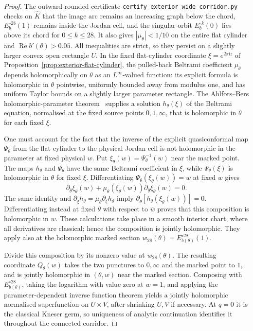 \documentclass[11pt,a4paper]{article}
\theoremstyle{definition}
\newcommand{\ii}{\mathrm{i}}
\begin{document}
\begin{proof}
The outward-rounded certificate
\texttt{certify\_exterior\_wide\_corridor.py} checks on $\widehat K$
that the image arc remains an increasing graph below the chord,
$E_b^{\circ28}(1)$ remains inside the Jordan cell, and the singular
orbit $E_b^{\circ k}(0)$ lies above its chord for $0\le k\le28$.
It also gives $|\mu_\theta|<1/10$ on the entire flat cylinder and
$\operatorname{Re}b'(\theta)>0.05$.  All inequalities are strict,
so they persist on a slightly larger convex open rectangle $U$.
In the fixed flat-cylinder coordinate
$\xi=e^{2\pi\ii z}$ of
Proposition~\ref{prop:exterior-flat-cylinder}, the pulled-back
Beltrami coefficient $\mu_\theta$ depends holomorphically on
$\theta$ as an $L^\infty$-valued function: its explicit formula is
holomorphic in $\theta$ pointwise, uniformly bounded away from
modulus one, and has uniform Taylor bounds on a slightly larger
parameter rectangle.  The Ahlfors--Bers holomorphic-parameter
theorem~\cite[Thm.~11]{AhlforsBers1960} supplies a solution
$h_\theta(\xi)$ of the Beltrami equation, normalised at the fixed
source points $0,1,\infty$, that is holomorphic in $\theta$ for
each fixed $\xi$.

One must account for the fact that the inverse of the explicit
quasiconformal map $\Psi_\theta$ from the flat cylinder to the
physical Jordan cell is not holomorphic in the parameter at fixed
physical $w$.  Put $\xi_\theta(w)=\Psi_\theta^{-1}(w)$ near the
marked point.  The maps $h_\theta$ and $\Psi_\theta$ have the same
Beltrami coefficient in $\xi$, while $\Psi_\theta(\xi)$ is
holomorphic in $\theta$ for fixed $\xi$.  Differentiating
$\Psi_\theta(\xi_\theta(w))=w$ at fixed $w$ gives
\[
 \partial_{\bar\theta}\xi_\theta(w)
 +\mu_\theta(\xi_\theta(w))
       \partial_{\bar\theta}\overline{\xi_\theta(w)}=0.
\]
The same identity and $\partial_{\bar\xi}h_\theta
=\mu_\theta\partial_\xi h_\theta$ imply
$\partial_{\bar\theta}
  [h_\theta(\xi_\theta(w))]=0$.
Differentiating instead at fixed $\theta$ with respect to
$\bar w$ proves that this composition is holomorphic in $w$.
These calculations take place in a smooth interior chart, where
all derivatives are classical; hence the composition is jointly
holomorphic.  They apply also at the holomorphic marked section
$w_{28}(\theta)=E_{b(\theta)}^{\circ28}(1)$.

Divide this composition by its nonzero value at $w_{28}(\theta)$.
The resulting coordinate $Q_\theta(w)$ takes the two punctures
to $0,\infty$ and the marked point to $1$, and is jointly
holomorphic in $(\theta,w)$ near the marked section.  Composing
with $E_{b(\theta)}^{\circ28}$, taking the logarithm with value
zero at $w=1$, and applying the parameter-dependent inverse
function theorem yields a jointly holomorphic normalised
superfunction on $U\times V$, after shrinking $U,V$ if necessary.
At $q=0$ it is the classical Kneser germ, so uniqueness of analytic
continuation identifies it throughout the connected corridor.


\end{proof}
\end{document}
